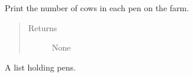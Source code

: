 \documentclass[letterpaper,10pt,english]{sphinxmanual}
\begin{document}
\begin{fulllineitems}
\begin{fulllineitems}
\end{fulllineitems}


\begin{fulllineitems}
\label{\detokenize{farming:farming.farm1.Farm.get_pen_allocation}}
\sphinxAtStartPar
Print the number of cows in each pen on the farm.
\begin{quote}\begin{description}
\item[{Returns}] \leavevmode
\sphinxAtStartPar
None

\end{description}\end{quote}

\end{fulllineitems}


\begin{fulllineitems}
\label{\detokenize{farming:farming.farm1.Farm.pens}}
\sphinxAtStartPar
A list holding pens.

\end{fulllineitems}


\end{fulllineitems}

\end{document}
